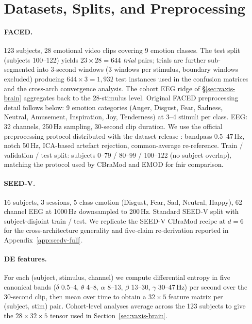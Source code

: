 
\section{Datasets, Splits, and Preprocessing}
\label{app:datasets}

\paragraph{FACED.} 123 subjects, 28 emotional video clips covering 9 emotion classes. The test split (subjects 100--122) yields $23 \times 28 = 644$ \emph{trial} pairs; trials are further sub-segmented into $3$-second windows ($3$ windows per stimulus, boundary windows excluded) producing $644\times3=1{,}932$ test instances used in the confusion matrices and the cross-arch convergence analysis. The cohort EEG ridge of \S\ref{sec:vaxis-brain} aggregates back to the $28$-stimulus level. Original FACED preprocessing detail follows below: 9
emotion categories (Anger, Disgust, Fear, Sadness, Neutral, Amusement,
Inspiration, Joy, Tenderness) at 3--4 stimuli per class. EEG: 32
channels, 250\,Hz sampling, 30-second clip duration. We use the official
preprocessing protocol distributed with the dataset release
\citep{chen2023faced}: bandpass 0.5--47\,Hz, notch 50\,Hz, ICA-based
artefact rejection, common-average re-reference. Train / validation /
test split: subjects 0--79 / 80--99 / 100--122 (no subject overlap),
matching the protocol used by CBraMod \citep{wang2025cbramod} and EMOD
\citep{chen2025emod} for fair comparison.

\paragraph{SEED-V.} 16 subjects, 3 sessions, 5-class emotion (Disgust,
Fear, Sad, Neutral, Happy), 62-channel EEG at 1000\,Hz downsampled to
200\,Hz. Standard SEED-V split with subject-disjoint train / test. We
replicate the SEED-V CBraMod recipe at $d{=}6$ for the cross-architecture
generality and five-claim re-derivation reported in
Appendix~\ref{app:seedv-full}.

\paragraph{DE features.} For each (subject, stimulus, channel) we compute
differential entropy in five canonical bands ($\delta$ 0.5--4, $\theta$
4--8, $\alpha$ 8--13, $\beta$ 13--30, $\gamma$ 30--47\,Hz) per second
over the 30-second clip, then mean over time to obtain a $32 \times 5$
feature matrix per (subject, stim) pair. Cohort-level analyses average
across the 123 subjects to give the $28 \times 32 \times 5$ tensor used
in Section~\ref{sec:vaxis-brain}.


